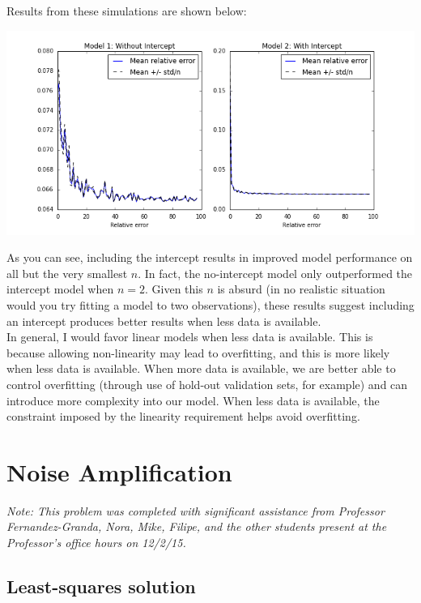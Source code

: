 \documentclass[paper=a4, fontsize=11pt]{scrartcl} %
\numberwithin{equation}{section} %
\numberwithin{figure}{section} %
\numberwithin{table}{section} %
\begin{document}
Results from these simulations are shown below:

\includegraphics[scale = 0.6]{Q3D_fig.png} 

As you can see, including the intercept results in improved model performance on all but the very smallest $n$. In fact, the no-intercept model only outperformed the intercept model when $n = 2$. Given this $n$ is absurd (in no realistic situation would you try fitting a model to two observations), these results suggest including an intercept produces better results when less data is available. \\

In general, I would favor linear models when less data is available. This is because allowing non-linearity may lead to overfitting, and this is more likely when less data is available. When more data is available, we are better able to control overfitting (through use of hold-out validation sets, for example) and can introduce more complexity into our model. When less data is available, the constraint imposed by the linearity requirement helps avoid overfitting.



\section{Noise Amplification}

\emph{Note: This problem was completed with significant assistance from Professor Fernandez-Granda, Nora, Mike, Filipe, and the other students present at the Professor's office hours on 12/2/15.}

\subsection{Least-squares solution}
\end{document}
